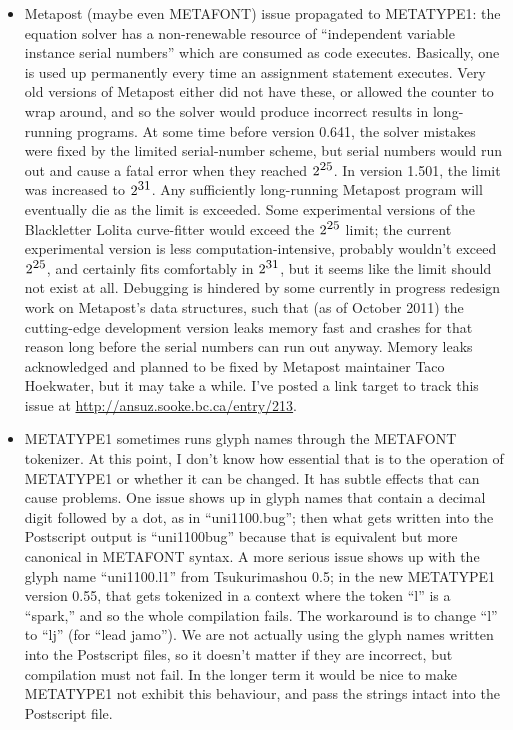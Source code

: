 \documentclass[14pt]{extarticle}
\begin{document}
\begin{itemize}
  \item Metapost (maybe even METAFONT) issue propagated to METATYPE1:
    the equation solver has a non-renewable resource of ``independent
    variable instance serial numbers'' which are consumed as code executes. 
    Basically, one is used up permanently every time an assignment statement
    executes.  Very old versions of Metapost either did not have these, or
    allowed the counter to wrap around, and so the solver would produce
    incorrect results in long-running programs.  At some time before
    version 0.641, the solver
    mistakes were fixed by the limited serial-number scheme, but
    serial numbers would run out and cause a fatal error when they reached
    $\textrm{2}^\textrm{\small 25}$.  In version 1.501, the limit was
    increased to $\textrm{2}^\textrm{\small 31}$.  Any sufficiently
    long-running Metapost program will eventually die as the limit is
    exceeded.  Some experimental versions of the Blackletter Lolita
    curve-fitter would exceed the $\textrm{2}^\textrm{\small 25}$ limit; the
    current experimental version is less computation-intensive, probably
    wouldn't exceed $\textrm{2}^\textrm{\small 25}$, and certainly fits
    comfortably in $\textrm{2}^\textrm{\small 31}$, but it seems like the
    limit should not exist at all.  Debugging is hindered by some currently
    in progress redesign work on Metapost's data structures, such that (as
    of October 2011) the cutting-edge development version leaks memory fast
    and crashes for that reason long before the serial numbers can run out
    anyway.  Memory leaks acknowledged and planned to be fixed by Metapost
    maintainer Taco Hoekwater, but it may take a while.  I've posted a link
    target to track this issue at \url{http://ansuz.sooke.bc.ca/entry/213}.

  \item METATYPE1 sometimes runs glyph names through the METAFONT
    tokenizer.  At this point, I don't know how essential that is to
    the operation of METATYPE1 or whether it can be changed.  It has
    subtle effects that can cause problems.  One issue shows up in
    glyph names that contain a decimal digit followed by a dot, as in
    ``uni1100.bug''; then what gets written into the Postscript output
    is ``uni1100bug'' because that is equivalent but more canonical in
    METAFONT syntax.  A more serious issue shows up with the glyph name
    ``uni1100.l1'' from Tsukurimashou 0.5; in the new METATYPE1 version
    0.55, that gets tokenized in a context where the token ``l'' is a
    ``spark,'' and so the whole compilation fails.  The workaround
    is to change ``l'' to ``lj'' (for ``lead jamo'').  We are not
    actually using the glyph names written into the Postscript files,
    so it doesn't matter if they are incorrect, but compilation must
    not fail.  In the longer term it would be nice to make METATYPE1
    not exhibit this behaviour, and pass the strings intact into the
    Postscript file.


\end{itemize}
\end{document}
